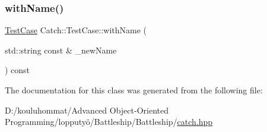 \subsubsection{\texorpdfstring{with\+Name()}{withName()}}
{\footnotesize\ttfamily \mbox{\hyperlink{class_catch_1_1_test_case}{Test\+Case}} Catch\+::\+Test\+Case\+::with\+Name (\begin{DoxyParamCaption}\item[{std\+::string const \&}]{\+\_\+new\+Name }\end{DoxyParamCaption}) const}



The documentation for this class was generated from the following file\+:\begin{DoxyCompactItemize}
\item 
D\+:/kouluhommat/\+Advanced Object-\/\+Oriented Programming/lopputyö/\+Battleship/\+Battleship/\mbox{\hyperlink{catch_8hpp}{catch.\+hpp}}\end{DoxyCompactItemize}

